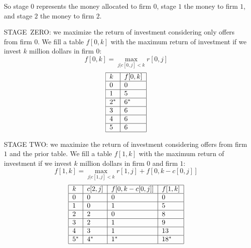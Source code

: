 \documentclass[justified, sixbynine]{tufte-book}
\theoremstyle{plain}%
\newtheorem * {corollary}{Corollary}
\theoremstyle{definition}
\theoremstyle{remark}
\newtheorem * {remark}{Remark}
\newtheorem * {note}{Note}
\begin{document}
\begin{fullwidth}
So stage $0$ represents the money allocated to firm $0$, stage $1$ the money
to firm $1$, and stage $2$ the money to firm $2$.

STAGE\ ZERO: we maximize the return of investment considering only offers
from firm 0. We fill a table $f[0, k]$ with the maximum return of investment
if we invest $k$ million dollars in firm $0$:
\begin{equation}
f[0, k]=\max_{j|c[0, j]<k}r[0, j]  \label{stage0}
\end{equation}
\begin{equation*}
\begin{tabular}{|l|l|}
\hline
$k$ & $f[0, k]$ \\ \hline
0 & 0 \\ \hline
1 & 5 \\ \hline
2$^{ * }$ & 6$^{ * }$ \\ \hline
3 & 6 \\ \hline
4 & 6 \\ \hline
5 & 6 \\ \hline
\end{tabular}
\label{table0}
\end{equation*}

STAGE TWO: we maximize the return of investment considering offers from firm $%
1$ and the prior table. We fill a table $f[1, k]$ with the maximum return of
investment if we invest $k$ million dollars in firm $0$ and firm $1$:
\begin{equation}
f[1, k]=\max_{j|c[1, j]<k}r[1, j]+f[0, k-c[0, j]]  \label{stage1}
\end{equation}
\begin{equation*}
\begin{tabular}{|l|l|l|l|}
\hline
$k$ & $c[2, j]$ & $f[0, k-c[0, j]]$ & $f[1, k]$ \\ \hline
0 & 0 & 0 & 0 \\ \hline
1 & 0 & 1 & 5 \\ \hline
2 & 2 & 0 & 8 \\ \hline
3 & 2 & 1 & 9 \\ \hline
4 & 3 & 1 & 13 \\ \hline
5$^{ * }$ & 4$^{ * }$ & 1$^{ * }$ & 18$^{ * }$ \\ \hline
\end{tabular}
\label{table_stage2}
\end{equation*}


\end{fullwidth}
\end{document}
